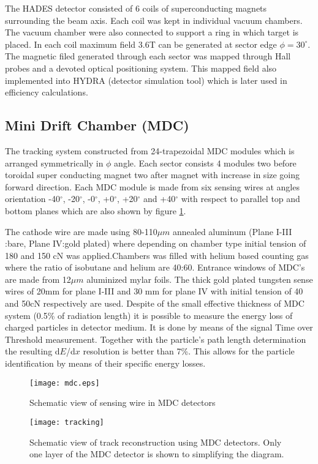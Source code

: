 The HADES detector consisted of 6 coils of superconducting magnets surrounding the beam axis. Each coil was kept in individual vacuum chambers. The vacuum chamber were also connected to support a ring in which target is placed. In each coil maximum field 3.6T can be generated at sector edge $\phi =30^\circ$. The magnetic filed generated through each sector was mapped through Hall probes and a devoted optical positioning system. This mapped field also implemented into HYDRA (detector simulation tool) which is later used in efficiency calculations.    
\subsection{Mini Drift Chamber (MDC)}
The tracking system constructed from 24-trapezoidal MDC modules which is arranged symmetrically in $\phi$ angle. Each sector consists 4 modules two before toroidal super conducting magnet two after magnet with increase in size going forward direction. Each MDC module is made from six sensing wires at angles orientation -40$^\circ$,  -20$^\circ$, -0$^\circ$, +0$^\circ$, +20$^\circ$ and +40$^\circ$ with respect to parallel top and bottom planes which are also shown by figure \ref{mdc}.   

The cathode wire are made using 80-110$\mu m$ annealed aluminum (Plane I-III :bare, Plane IV:gold plated) where depending on chamber type initial tension of 180 and 150 cN was applied.Chambers was filled with helium based counting gas where the ratio of isobutane and helium are 40:60.  Entrance windows of  MDC's are made from 12$\mu m$ aluminized mylar foils. The thick gold plated tungsten sense wires of 20mm for plane I-III  and 30 mm for plane IV with initial tension of 40 and 50cN respectively are used. 
Despite of the small effective thickness of MDC system (0.5\% of radiation length) it is possible to measure the energy loss of charged particles in detector medium. It is done by means of the signal Time over Threshold \cite{Kipnis} measurement. Together with the particle's path length determination the resulting d$E$/d$x$ resolution is better than 7\%. This allows for the particle identification by means of their specific energy losses.
\begin{figure}
	\centering
	\texttt{[image: mdc.eps]}
	\caption{Schematic view of sensing wire in MDC detectors }
	\label{mdc}
\end{figure}
\begin{figure}
	\centering
	\texttt{[image: tracking]}
	\caption{Schematic view of track reconstruction using MDC detectors. Only one layer of the MDC detector is shown to simplifying the diagram.  }
	\label{tracking}
\end{figure}
